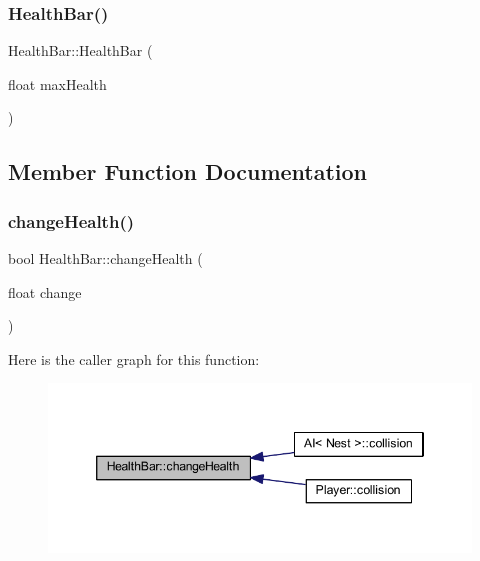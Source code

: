 \subsubsection{\texorpdfstring{Health\+Bar()}{HealthBar()}\hspace{0.1cm}{\footnotesize\ttfamily [2/2]}}
{\footnotesize\ttfamily Health\+Bar\+::\+Health\+Bar (\begin{DoxyParamCaption}\item[{float}]{max\+Health }\end{DoxyParamCaption})}



\subsection{Member Function Documentation}
\mbox{\label{class_health_bar_a4e19dbe3bf281bcb0849096ce124ae5a}} 
\subsubsection{\texorpdfstring{change\+Health()}{changeHealth()}}
{\footnotesize\ttfamily bool Health\+Bar\+::change\+Health (\begin{DoxyParamCaption}\item[{float}]{change }\end{DoxyParamCaption})}

Here is the caller graph for this function\+:
\nopagebreak
\begin{figure}[H]
\begin{center}
\leavevmode
\includegraphics[width=346pt]{class_health_bar_a4e19dbe3bf281bcb0849096ce124ae5a_icgraph}
\end{center}
\end{figure}
\mbox{\label{class_health_bar_a3b7bafeb8bcc5a58d3eb2756e2542e77}} 
